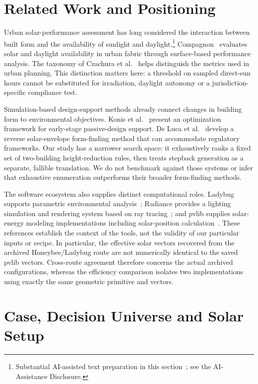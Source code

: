 \documentclass{llncs}
\newcommand{\aidraft}{\footnote{Substantial AI-assisted text preparation in this section~\cite{openai2026}; see the AI-Assistance Disclosure.}}
\begin{document}
\section{Related Work and Positioning}
Urban solar-performance assessment has long considered the interaction between built form and the availability of sunlight and daylight.\aidraft{} Compagnon~\cite{compagnon2004urban} evaluates solar and daylight availability in urban fabric through surface-based performance analysis. The taxonomy of Czachura et al.~\cite{czachura2022metrics} helps distinguish the metrics used in urban planning. This distinction matters here: a threshold on sampled direct-sun hours cannot be substituted for irradiation, daylight autonomy or a jurisdiction-specific compliance test.

Simulation-based design-support methods already connect changes in building form to environmental objectives. Konis et al.~\cite{konis2016passive} present an optimization framework for early-stage passive-design support. De Luca et al.~\cite{deluca2021reverse} develop a reverse solar-envelope form-finding method that can accommodate regulatory frameworks. Our study has a narrower search space: it exhaustively ranks a fixed set of two-building height-reduction rules, then treats stepback generation as a separate, fallible translation. We do not benchmark against those systems or infer that exhaustive enumeration outperforms their broader form-finding methods.

The software ecosystem also supplies distinct computational roles. Ladybug supports parametric environmental analysis~\cite{roudsari2013ladybug}; Radiance provides a lighting simulation and rendering system based on ray tracing~\cite{ward1994radiance}; and pvlib supplies solar-energy modeling implementations including solar-position calculation~\cite{holmgren2018pvlib}. These references establish the context of the tools, not the validity of our particular inputs or recipe. In particular, the effective solar vectors recovered from the archived Honeybee/Ladybug route are not numerically identical to the saved pvlib vectors. Cross-route agreement therefore concerns the actual archived configurations, whereas the efficiency comparison isolates two implementations using exactly the same geometric primitive and vectors.

\section{Case, Decision Universe and Solar Setup}
\end{document}
